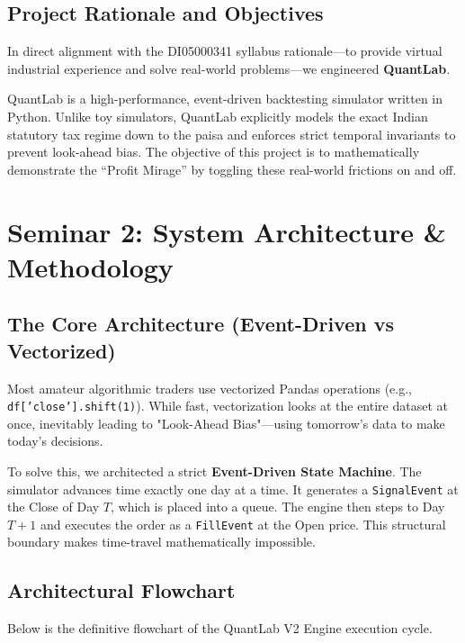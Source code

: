 \documentclass[12pt,a4paper,oneside]{report}
\begin{document}
\section{Project Rationale and Objectives}
In direct alignment with the DI05000341 syllabus rationale—to provide virtual industrial experience and solve real-world problems—we engineered \textbf{QuantLab}. 

QuantLab is a high-performance, event-driven backtesting simulator written in Python. Unlike toy simulators, QuantLab explicitly models the exact Indian statutory tax regime down to the paisa and enforces strict temporal invariants to prevent look-ahead bias. The objective of this project is to mathematically demonstrate the ``Profit Mirage'' by toggling these real-world frictions on and off.

\chapter{Seminar 2: System Architecture \& Methodology}

\section{The Core Architecture (Event-Driven vs Vectorized)}
Most amateur algorithmic traders use vectorized Pandas operations (e.g., \texttt{df['close'].shift(1)}). While fast, vectorization looks at the entire dataset at once, inevitably leading to "Look-Ahead Bias"—using tomorrow's data to make today's decisions. 

To solve this, we architected a strict \textbf{Event-Driven State Machine}. The simulator advances time exactly one day at a time. It generates a \texttt{SignalEvent} at the Close of Day $T$, which is placed into a queue. The engine then steps to Day $T+1$ and executes the order as a \texttt{FillEvent} at the Open price. This structural boundary makes time-travel mathematically impossible.

\section{Architectural Flowchart}
Below is the definitive flowchart of the QuantLab V2 Engine execution cycle.
\end{document}
